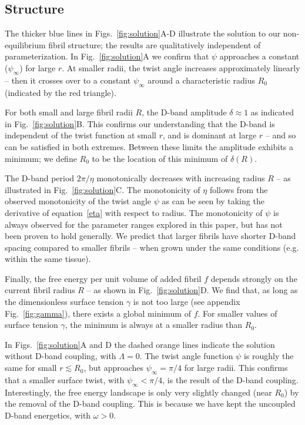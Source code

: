 \documentclass[twoside,twocolumn,9pt]{article}
\begin{document}
\subsection{Structure}
The thicker blue lines in Figs.~\ref{fig:solution}A-D illustrate the solution to our non-equilibrium fibril structure; the results are qualitatively independent of parameterization. In Fig.~\ref{fig:solution}A we confirm that $\psi$ approaches a constant ($\psi_{\infty}$) for large $r$.  At smaller radii, the twist angle increases approximately linearly -- then it crosses over to a constant $\psi_\infty$ around a characteristic radius $R_0$ (indicated by the red triangle).

For both small and large fibril radii $R$, the D-band amplitude  $\delta \approx 1$ as indicated in Fig.~\ref{fig:solution}B. This confirms our understanding that the D-band is independent of the twist function at small $r$, and is dominant at large $r$ -- and so can be satisfied in both extremes. Between these limits the amplitude exhibits a minimum;  we define $R_0$ to be the location of this minimum of $\delta(R)$.

The D-band period $2\pi/\eta$ monotonically decreases with increasing radius $R$ -- as illustrated in Fig.~\ref{fig:solution}C.  The monotonicity of $\eta$ follows from the observed monotonicity of the twist angle $\psi$ as can be seen by taking the derivative of equation~\ref{eta} with respect to radius. The monotonicity of $\psi$ is always observed for the parameter ranges explored in this paper, but has not been proven to hold generally.  We predict that larger fibrils have shorter D-band spacing compared to smaller fibrils -- when grown under the same conditions (e.g. within the same tissue). 

Finally, the free energy per unit volume of added fibril $f$ depends strongly on the current fibril radius $R$ -- as shown in Fig.~\ref{fig:solution}D.  We find that, as long as the dimensionless surface tension $\gamma$ is not too large (see appendix Fig.~\ref{fig:gamma}), there exists a global minimum of $f$.  For smaller values of surface tension $\gamma$, the minimum is always at a smaller radius than $R_0$. 

In Figs.~\ref{fig:solution}A and D the dashed orange lines indicate the solution without D-band coupling, with $\Lambda=0$. The twist angle function $\psi$ is roughly the same for small $r \lesssim R_0$, but approaches  $\psi_\infty = \pi/4$ for large radii. This confirms that a smaller surface twist, with $\psi_\infty<\pi/4$, is the result of the D-band coupling. Interestingly, the free energy landscape is only very slightly changed (near $R_0$) by the removal of the D-band coupling. This is because we have kept the uncoupled D-band energetics, with $\omega>0$. 
\end{document}

